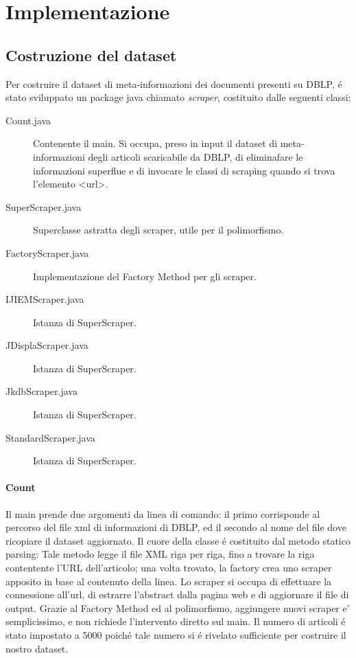 \documentclass[11pt,a4paper]{article}
\begin{document}
 




\section{Implementazione}
\label{sec:implementation}


\subsection{Costruzione del dataset}
Per costruire il dataset di meta-informazioni dei documenti presenti su DBLP, \'e stato sviluppato un package java chiamato \emph{scraper}, costituito dalle seguenti classi:
\begin{description}
	\item[Count.java] Contenente il main. Si occupa, preso in input il dataset di meta-informazioni degli articoli scaricabile da DBLP, di eliminafare le informazioni superflue e di invocare le classi di scraping quando si trova l'elemento <url>.
	\item[SuperScraper.java] Superclasse astratta degli scraper, utile per il polimorfismo.
	\item[FactoryScraper.java] Implementazione del Factory Method per gli scraper.
	\item[IJIEMScraper.java] Istanza di SuperScraper.
	\item[JDisplaScraper.java] Istanza di SuperScraper.
	\item[JkdbScraper.java] Istanza di SuperScraper.
	\item[StandardScraper.java] Istanza di SuperScraper.
\end{description}

\paragraph{Count}
\label{par:count}



Il main prende due argomenti da linea di comando: il primo corrisponde al percorso del file xml di informazioni di DBLP, ed il secondo al nome del file dove ricopiare il dataset aggiornato. Il cuore della classe \'e costituito dal metodo statico parsing: Tale metodo legge il file XML riga per riga, fino a trovare la riga contentente l'URL dell'articolo; una volta trovato, la factory crea uno scraper apposito in base al contenuto della linea. Lo scraper si occupa di effettuare la connessione all'url, di estrarre l'abstract dalla pagina web e di aggiornare il file di output. Grazie al Factory Method ed al polimorfismo, aggiungere nuovi scraper e' semplicissimo, e non richiede l'intervento diretto sul main. Il numero di articoli \'e stato impostato a 5000 poich\'e tale numero si \'e rivelato sufficiente per costruire il nostro dataset.
\end{document}

